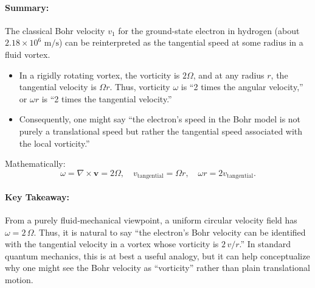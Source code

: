 \paragraph{Summary:}
The classical Bohr velocity $v_1$ for the ground-state electron in hydrogen (about $2.18 \times 10^6 \text{ m/s}$) can be reinterpreted as the tangential speed at some radius in a fluid vortex.

\begin{itemize}
    \item In a rigidly rotating vortex, the vorticity is $2\Omega$, and at any radius $r$, the tangential velocity is $\Omega r$. Thus, vorticity $\omega$ is ``2 times the angular velocity,'' or $\omega r$ is ``2 times the tangential velocity.''
    \item Consequently, one might say ``the electron’s speed in the Bohr model is not purely a translational speed but rather the tangential speed associated with the local vorticity.''
\end{itemize}

Mathematically:
\begin{equation}
    \boxed{ \omega = \nabla \times \mathbf{v} = 2\Omega,\quad v_{\text{tangential}} = \Omega r, \quad \omega r = 2 v_{\text{tangential}}. }\label{eq:2-times-tangential}
\end{equation}


\paragraph{Key Takeaway:} From a purely fluid‐mechanical viewpoint, a uniform circular velocity field has $\omega = 2 \,\Omega$.
Thus, it is natural to say “the electron’s Bohr velocity can be identified with the tangential velocity in a vortex whose vorticity is $2\,v/r$.” In standard quantum mechanics, this is at best a useful analogy, but it can help conceptualize why one might see the Bohr velocity as “vorticity” rather than plain translational motion.
